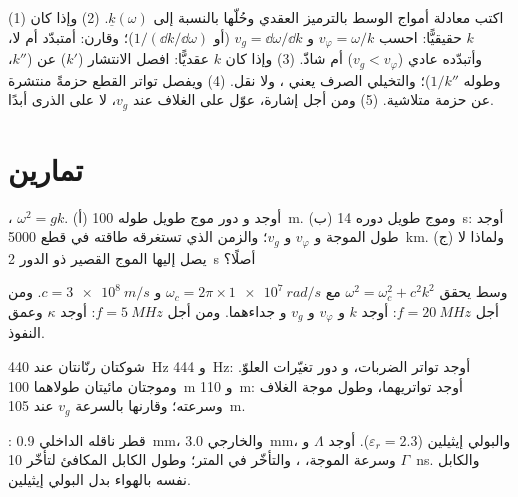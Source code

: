 \begin{method}\label{met:b2:dispersion-wave-packets:method}
(1) اكتب معادلة أمواج الوسط بالترميز العقدي وحُلّها
بالنسبة إلى $\underline k(\omega)$. (2) وإذا كان $k$ حقيقيًّا: احسب $v_\varphi = \omega/k$ و
$v_g = \dd\omega/\dd k$ (أو $1/(\dd k/\dd\omega)$)؛ وقارن: أمتبدّد أم لا،
وأتبدّده عادي ($v_g < v_\varphi$) أم شاذّ. (3) وإذا كان $k$ عقديًّا: افصل
الانتشار ($k'$) عن  ($k''$، وطوله $1/k''$)؛ والتخيلي الصرف
يعني ، ولا نقل. (4) ويفصل تواتر القطع
حزمةً منتشرة عن حزمة متلاشية. (5) ومن أجل إشارة،
عوّل على الغلاف عند $v_g$، لا على الذرى أبدًا.
\end{method}

\section{تمارين}

\begin{exercise}[$\star$]\label{exo:b2:dispersion-wave-packets:1}
، $\omega^2 = gk$. (أ) أوجد   و
دور موج طويل طوله \qty{100}{m}. (ب) وموج طويل دوره \qty{14}{s}:
أوجد طول الموجة و $v_\varphi$ و $v_g$؛ والزمن الذي تستغرقه طاقته في قطع \qty{5000}{km}.
(ج) ولماذا لا يصل إليها الموج القصير ذو الدور \qty{2}{s} أصلًا؟
\end{exercise}

\begin{exercise}[$\star$]\label{exo:b2:dispersion-wave-packets:2}
وسط يحقق $\omega^2 = \omega_c^2 + c^2k^2$ مع $\omega_c = 2\pi \times \qty{1e7}{rad/s}$
و $c = \qty{3e8}{m/s}$. ومن أجل $f = \qty{20}{MHz}$: أوجد $k$ و $v_\varphi$ و $v_g$ و
جداءهما. ومن أجل $f = \qty{5}{MHz}$: أوجد $\kappa$ وعمق النفوذ.
\end{exercise}

\begin{exercise}[$\star$]\label{exo:b2:dispersion-wave-packets:3}
شوكتان رنّانتان عند \qty{440}{Hz} و \qty{444}{Hz}: أوجد تواتر الضربات، و
دور تغيّرات العلوّ. وموجتان مائيتان طولاهما
\qty{100}{m} و \qty{110}{m}: أوجد تواتريهما، وطول موجة الغلاف وسرعته؛
وقارنها بالسرعة $v_g$ عند \qty{105}{m}.
\end{exercise}

\begin{exercise}[$\star$]\label{exo:b2:dispersion-wave-packets:4}
: قطر ناقله الداخلي \qty{0.9}{mm}، والخارجي
\qty{3.0}{mm}، والبولي إيثيلين ($\varepsilon_r = 2.3$). أوجد $\Lambda$ و $\Gamma$ وسرعة الموجة،
، والتأخّر في المتر؛ وطول الكابل المكافئ
لتأخّر \qty{10}{ns}. والكابل نفسه بالهواء بدل البولي إيثيلين.
\end{exercise}

